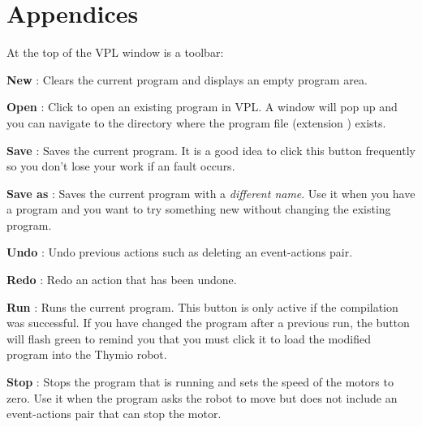 \part{Appendices}

\label{a.toolbar}

At the top of the VPL window is a toolbar:

\begin{center}
\end{center}

\bigskip

\textbf{New} : Clears the current program and displays an
empty program area.

\bigskip

\textbf{Open} : Click to open an existing program in VPL. A
window will pop up and you can navigate to the directory where the
program file (extension ) exists.

\bigskip

\textbf{Save} : Saves the current program. It is a good idea
to click this button frequently so you don't lose your work if an fault
occurs.

\bigskip

\textbf{Save as} : Saves the current program with a
\emph{different name}. Use it when you have a program and you want to
try something new without changing the existing program.

\bigskip

\textbf{Undo} : Undo previous actions such as deleting
an event-actions pair.\label{p.undo}

\bigskip

\textbf{Redo} : Redo an action that has been undone.

\bigskip

\textbf{Run} : Runs the current program. This button is only
active if the compilation was successful. If you have changed the
program after a previous run, the button will flash green to remind you that
you must click it to load the modified program into the Thymio robot.

\bigskip

\textbf{Stop} : Stops the program that is running and sets
the speed of the motors to zero. Use it when the program asks the robot
to move but does not include an event-actions pair that can stop the
motor.

\bigskip

